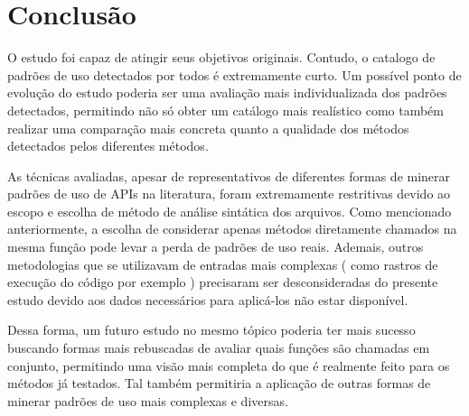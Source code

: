 \section{Conclusão}

O estudo foi capaz de atingir seus objetivos originais. Contudo, o catalogo de
padrões de uso detectados por todos é extremamente curto. Um possível ponto de
evolução do estudo poderia ser uma avaliação mais individualizada dos padrões
detectados, permitindo não só obter um catálogo mais realístico como também
realizar uma comparação mais concreta quanto a qualidade dos métodos detectados
pelos diferentes métodos.

As técnicas avaliadas, apesar de representativos de diferentes formas de minerar
padrões de uso de APIs na literatura, foram extremamente restritivas devido ao
escopo e escolha de método de análise sintática dos arquivos. Como mencionado
anteriormente, a escolha de considerar apenas métodos diretamente chamados na
mesma função pode levar a perda de padrões de uso reais. Ademais, outros
metodologias que se utilizavam de entradas mais complexas ( como rastros de
execução do código por exemplo ) precisaram ser desconsideradas do presente
estudo devido aos dados necessários para aplicá-los não estar disponível.

Dessa forma, um futuro estudo no mesmo tópico poderia ter mais sucesso buscando
formas mais rebuscadas de avaliar quais funções são chamadas em conjunto,
permitindo uma visão mais completa do que é realmente feito para os métodos já
testados. Tal também permitiria a aplicação de outras formas de minerar padrões
de uso mais complexas e diversas.
